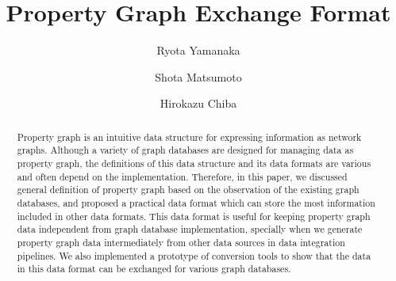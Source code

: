 \documentclass[runningheads]{llncs}
\begin{document}
\newtheorem{defi}[theorem]{Definition}
%
\title{Property Graph Exchange Format}
%
%
\author{Ryota Yamanaka \and Shota Matsumoto \and Hirokazu Chiba}
%
%
%
\maketitle              %
%
\begin{abstract}
Property graph is an intuitive data structure for expressing information as network graphs. Although a variety of graph databases are designed for managing data as property graph, the definitions of this data structure and its data formats are various and often depend on the implementation. Therefore, in this paper, we discussed general definition of property graph based on the observation of the existing graph databases, and proposed a practical data format which can store the most information included in other data formats. This data format is useful for keeping property graph data independent from graph database implementation, specially when we generate property graph data intermediately from other data sources in data integration pipelines. We also implemented a prototype of conversion tools to show that the data in this data format can be exchanged for various graph databases.
\end{abstract}
\end{document}
